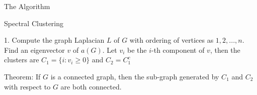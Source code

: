 \documentclass[hyperref, notheorems]{beamer}
\theoremstyle{definition}
\begin{document}
\begin{frame}{The Algorithm}
\begin{algorithm}[H]
\caption{Spectral Clustering}\label{alg:two}
1. Compute the graph Laplacian $L$ of $G$ with ordering of vertices as $1, 2, ..., n$. Find an eigenvector $v$ of $a(G)$. Let $v_i$ be the $i$-th component of $v$, then the clusters are $C_1 = \{i: v_i \geq 0\}$ and $C_2 = C_1^c$
\end{algorithm}

\begin{block}{Theorem: }
    If $G$ is a connected graph, then the sub-graph generated by $C_1$ and $C_2$ with respect to $G$ are both connected.
\end{block}
\end{frame}
\end{document}
